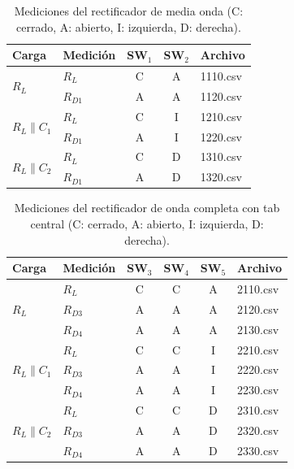 \begin{table}[!t]
  \centering
  \footnotesize
  \caption{Mediciones del rectificador de media onda (C: cerrado, A: abierto, I: izquierda, D: derecha).}
  \label{tab:med_media}
  \begin{tabular}{llccl}
    \toprule
    \textbf{Carga} & \textbf{Medición} & \textbf{SW$_1$} & \textbf{SW$_2$} & \textbf{Archivo} \\ \midrule
    \multirow{2}{*}{$R_L$}               & $R_L$    & C & A & 1110.csv \\
                                         & $R_{D1}$ & A & A & 1120.csv \\ \midrule
    \multirow{2}{*}{$R_L \parallel C_1$} & $R_L$    & C & I & 1210.csv \\
                                         & $R_{D1}$ & A & I & 1220.csv \\ \midrule
    \multirow{2}{*}{$R_L \parallel C_2$} & $R_L$    & C & D & 1310.csv \\
                                         & $R_{D1}$ & A & D & 1320.csv \\ \bottomrule
  \end{tabular}
\end{table}

\begin{table}[!t]
  \centering
  \footnotesize
  \caption{Mediciones del rectificador de onda completa con tab central (C: cerrado, A: abierto, I: izquierda, D: derecha).}
  \label{tab:med_tab}
  \begin{tabular}{llcccl}
    \toprule
    \textbf{Carga} & \textbf{Medición} & \textbf{SW$_3$} & \textbf{SW$_4$} & \textbf{SW$_5$} & \textbf{Archivo} \\ \midrule
    \multirow{3}{*}{$R_L$}               & $R_L$    & C & C & A & 2110.csv \\
                                         & $R_{D3}$ & A & A & A & 2120.csv \\
                                         & $R_{D4}$ & A & A & A & 2130.csv \\ \midrule
    \multirow{3}{*}{$R_L \parallel C_1$} & $R_L$    & C & C & I & 2210.csv \\
                                         & $R_{D3}$ & A & A & I & 2220.csv \\
                                         & $R_{D4}$ & A & A & I & 2230.csv \\ \midrule
    \multirow{3}{*}{$R_L \parallel C_2$} & $R_L$    & C & C & D & 2310.csv \\
                                         & $R_{D3}$ & A & A & D & 2320.csv \\
                                         & $R_{D4}$ & A & A & D & 2330.csv \\ \bottomrule
  \end{tabular}
\end{table}

